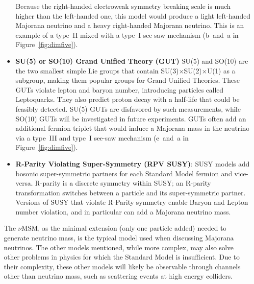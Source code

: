 \documentclass[/main.tex]{subfiles}
\begin{document}
\begin{itemize}
  Because the right-handed electroweak symmetry breaking scale is much higher than the left-handed one, this model would produce a light left-handed Majorana neutrino and a heavy right-handed Majorana neutrino.
  This is an example of a type~II mixed with a type~I see-saw mechanism (b~and~a in Figure~\ref{fig:dimfive}).
\item \textbf{SU(5) or SO(10) Grand Unified Theory (GUT)} SU(5) and SO(10) are the two smallest simple Lie groups that contain SU(3)$\times$SU(2)$\times$U(1) as a subgroup, making them popular groups for Grand Unified Theories.
  These GUTs violate lepton and baryon number, introducing particles called Leptoquarks.
  They also predict proton decay with a half-life that could be feasibly detected\cite{SuperK:pdecay}.
  SU(5) GUTs are disfavored by such measurements, while SO(10) GUTs will be investigated in future experiments.
  GUTs often add an additional fermion triplet that would induce a Majorana mass in the neutrino via a type~III and type~I see-saw mechanism (c~and~a in Figure~\ref{fig:dimfive}).
\item \textbf{R-Parity Violating Super-Symmetry (RPV SUSY)}: SUSY models add bosonic super-symmetric partners for each Standard Model fermion and vice-versa.
  R-parity is a discrete symmetry within SUSY; an R-parity transformation switches between a particle and its super-symmetric partner.
  Versions of SUSY that violate R-Parity symmetry enable Baryon and Lepton number violation, and in particular can add a Majorana neutrino mass.
\end{itemize}
The $\nu$MSM, as the minimal extension (only one particle added) needed to generate neutrino mass, is the typical model used when discussing Majorana neutrinos.
The other models mentioned, while more complex, may also solve other problems in physics for which the Standard Model is insufficient.
Due to their complexity, these other models will likely be observable through channels other than neutrino mass, such as scattering events at high energy colliders.
\end{document}
